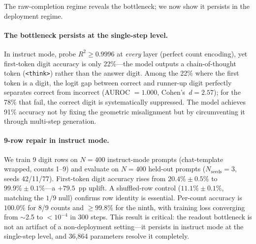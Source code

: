 \documentclass{article}
\begin{document}
The raw-completion regime reveals the bottleneck; we now show it persists in the deployment regime.

\paragraph{The bottleneck persists at the single-step level.}
In instruct mode, probe $R^2 \geq 0.9996$ at \emph{every} layer (perfect count encoding),
yet first-token digit accuracy is only 22\%---the model outputs a chain-of-thought token (\texttt{<think>}) rather than the answer digit.
Among the 22\% where the first token is a digit, the logit gap between correct and runner-up digit perfectly separates correct from incorrect (AUROC $= 1.000$, Cohen's~$d = 2.57$);
for the 78\% that fail, the correct digit is systematically suppressed.
The model achieves 91\% accuracy not by fixing the geometric misalignment but by circumventing it through multi-step generation.

\paragraph{9-row repair in instruct mode.}
We train 9 digit rows on $N{=}400$ instruct-mode prompts (chat-template wrapped, counts 1--9) and evaluate on $N{=}400$ held-out prompts ($N_{\text{seeds}}{=}3$, seeds 42/11/77).
First-token digit accuracy rises from $20.4\% \pm 0.5\%$ to $\mathbf{99.9\% \pm 0.1\%}$---a $+79.5$~pp uplift.
A shuffled-row control ($11.1\% \pm 0.1\%$, matching the $1/9$ null) confirms row identity is essential.
Per-count accuracy is $100.0\%$ for 8/9 counts and $\geq 99.8\%$ for the ninth, with training loss converging from $\sim$2.5 to $< 10^{-4}$ in 300 steps.
This result is critical: the readout bottleneck is not an artifact of a non-deployment setting---it persists in instruct mode at the single-step level, and 36,864 parameters resolve it completely.
\end{document}
